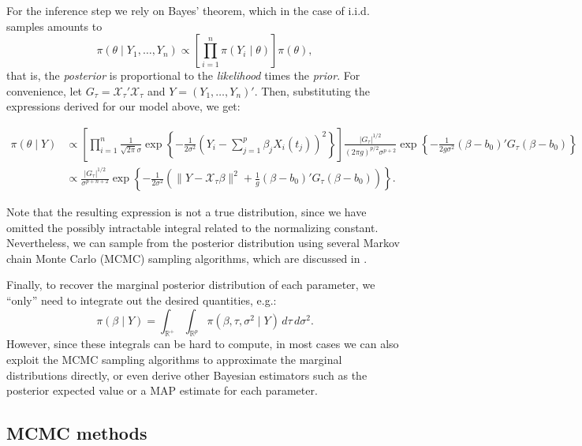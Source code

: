 \documentclass[
  a4paper,
	fontsize=11pt, %
	twoside=false, %
  secnumdepth=2,
	numbers=noenddot, %
]{kaohandt}
\newcommand{\R} {\ensuremath{\mathds{R}}}
\begin{document}
For the inference step we rely on Bayes' theorem, which in the case of i.i.d. samples amounts to
\[
  \pi(\theta \mid Y_1, \dots, Y_n) \propto \left[ \prod_{i=1}^n \pi(Y_i\mid \theta) \right]\pi(\theta),
\]
that is, the \textit{posterior} is proportional to the \textit{likelihood} times the \textit{prior}. For convenience, let \(G_\tau=\mathcal X_\tau' \mathcal X_\tau\) and \(Y = (Y_1,\dots, Y_n)'\). Then, substituting the expressions derived for our model above, we get:
\begin{widepar}
  \begin{align*}
    \pi(\theta \mid Y) & \propto \left[ \prod_{i=1}^n  \frac{1}{\sqrt{2\pi}\sigma} \exp\left\{ -\frac{1}{2\sigma^2} \left(Y_i - \sum_{j=1}^{p}\beta_j X_i(t_j)\right)^2 \right\}\right]\frac{|G_\tau|^{1/2}}{(2\pi g)^{p/2}\sigma^{p+2}} \exp\left\{ -\frac{1}{2g\sigma^2} (\beta - b_0)'G_\tau(\beta - b_0)\right\} \\
                       & \propto \frac{|G_\tau|^{1/2}}{\sigma^{p+n+2}} \exp\left\{ -\frac{1}{2\sigma^2} \left(\|Y- \mathcal X_\tau\beta\|^2 + \frac{1}{g}(\beta - b_0)'G_\tau(\beta - b_0) \right) \right\}.
  \end{align*}
\end{widepar}
Note that the resulting expression is not a true distribution, since we have omitted the possibly intractable integral related to the normalizing constant. Nevertheless, we can sample from the posterior distribution using several Markov chain Monte Carlo (MCMC) sampling algorithms, which are discussed in .

Finally, to recover the marginal posterior distribution of each parameter, we ``only'' need to integrate out the desired quantities, e.g.:
\[
  \pi(\beta\mid Y) = \int_{\R^+}\int_{\R^p} \pi(\beta, \tau, \sigma^2\mid Y)\, d\tau\, d\sigma^2.
\]
However, since these integrals can be hard to compute, in most cases we can also exploit the MCMC sampling algorithms to approximate the marginal distributions directly, or even derive other Bayesian estimators such as the posterior expected value or a MAP estimate for each parameter.
\subsection{MCMC methods}
\end{document}
